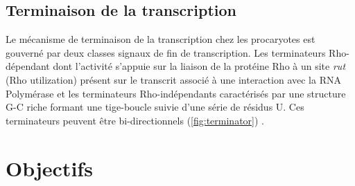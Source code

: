 \documentclass[12pt,a4paper]{report}
\begin{document}
\begin{onehalfspace}
\subsection*{Terminaison de la transcription}

Le mécanisme de terminaison de la transcription chez les procaryotes est gouverné par deux classes signaux de fin de transcription. Les terminateurs Rho-dépendant dont l'activité s'appuie sur la liaison de la protéine Rho à un site \emph{rut} (Rho utilization) présent sur le transcrit associé à une interaction avec la RNA Polymérase et les terminateurs Rho-indépendants caractérisés par une structure G-C riche formant une tige-boucle suivie d'une série de résidus U. Ces terminateurs peuvent être bi-directionnels (\autoref{fig:terminator}) \citep{Henkin2000,Lesnik2001}.  

\begin{figure}
\end{figure}

\section*{Objectifs}


\end{onehalfspace}
\end{document}
